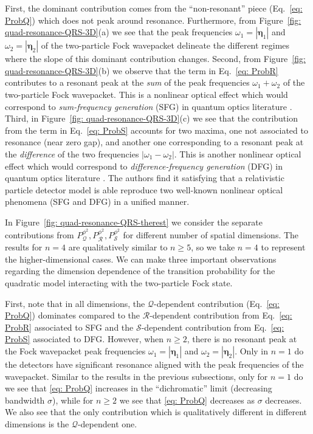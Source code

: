 \documentclass[11pt,prd,onecolumn,superscriptaddress,nofootinbib,floatfix,amsmath,amssymb]{revtex4-2}
\newcommand{\ba}{{\bm{\eta}_1}}
\newcommand{\bb}{{\bm{\eta}_2}}
\begin{document}
    First, the dominant contribution comes from the ``non-resonant'' piece (Eq.~\eqref{eq: ProbQ}) which  does not peak around resonance. Furthermore, from Figure~\ref{fig: quad-resonance-QRS-3D}(a) we see that the peak frequencies $\omega_1=|\ba| $ and $ \omega_2 = |\bb|$ of the two-particle Fock wavepacket delineate the different regimes where the slope of this dominant contribution changes. Second, from Figure~\ref{fig: quad-resonance-QRS-3D}(b) we observe that the term in Eq.~\eqref{eq: ProbR} contributes to a resonant peak at the \textit{sum} of the peak frequencies $\omega_1+\omega_2$ of the two-particle Fock wavepacket. This is a nonlinear optical effect which would correspond to \textit{sum-frequency generation} (SFG) in quantum optics literature \cite{boyd2008nonlinear}. Third, in Figure~\ref{fig: quad-resonance-QRS-3D}(c) we see that the contribution from the term in Eq.~\eqref{eq: ProbS} accounts for two maxima, one not associated to resonance (near zero gap), and another one corresponding to a resonant peak at the \textit{difference} of the two frequencies $\left|\omega_1-\omega_2\right|$. This is another nonlinear optical effect which would correspond to \textit{difference-frequency generation} (DFG) in quantum optics literature \cite{boyd2008nonlinear}. 
    The authors find it satisfying that a relativistic particle detector model is able reproduce two well-known nonlinear optical phenomena (SFG and DFG) in a unified manner.
    
    In Figure~\ref{fig: quad-resonance-QRS-therest} we consider the separate contributions from $P^{\phi^2}_{\mathcal{Q}},P^{\phi^2}_{\mathcal{R}},P^{\phi^2}_{\mathcal{S}}$ for different number of spatial dimensions. The results for $n=4$ are qualitatively similar to $n\geq 5$, so we take $n = 4$ to represent the higher-dimensional cases. We can make three important observations regarding the dimension dependence of the transition probability for the quadratic model interacting with the two-particle Fock state.
    
    First, note that in all dimensions, the $\mathcal{Q}$-dependent contribution (Eq.~\eqref{eq: ProbQ}) dominates compared to the $\mathcal{R}$-dependent contribution from Eq.~\eqref{eq: ProbR} associated to SFG and the $\mathcal{S}$-dependent contribution from Eq.~\eqref{eq: ProbS} associated to DFG. However, when $n\geq 2$, there is no resonant peak at the Fock wavepacket peak frequencies $\omega_1=|\ba|$ and $\omega_2=|\bb|$. Only in $n=1$ do the detectors have significant resonance aligned with the peak frequencies of the wavepacket. Similar to the results in the previous subsections, only for $n=1$ do we see that \eqref{eq: ProbQ} increases in the ``dichromatic'' limit (decreasing bandwidth $\sigma$), while for $n\geq 2$ we see that \eqref{eq: ProbQ} decreases as $\sigma$ decreases. We also see that the only contribution which is qualitatively different in different dimensions is the $\mathcal{Q}$-dependent one.
    
\end{document}
